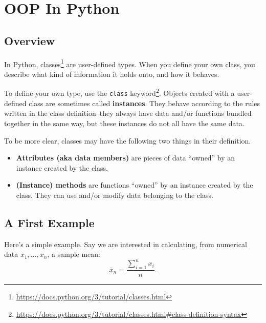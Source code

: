 \documentclass[12pt,krantz2]{krantz}
\renewcommand{\href}[2]{#2\footnote{\url{#1}}}
\begin{document}
\hypertarget{oop-in-python}{%
\section{OOP In Python}\label{oop-in-python}}

\hypertarget{overview}{%
\subsection{Overview}\label{overview}}

In Python, \href{https://docs.python.org/3/tutorial/classes.html}{classes} are user-defined types. When you define your own class, you describe what kind of information it holds onto, and how it behaves.

To define your own type, use the \href{https://docs.python.org/3/tutorial/classes.html\#class-definition-syntax}{\texttt{class} keyword}. Objects created with a user-defined class are sometimes called \textbf{instances}. They behave according to the rules written in the class definition--they always have data and/or functions bundled together in the same way, but these instances do not all have the same data.

To be more clear, classes may have the following two things in their definition.

\begin{itemize}
\item
  \textbf{Attributes (aka data members)} are pieces of data ``owned'' by an instance created by the class.
\item
  \textbf{(Instance) methods} are functions ``owned'' by an instance created by the class. They can use and/or modify data belonging to the class.
\end{itemize}

\hypertarget{a-first-example}{%
\subsection{A First Example}\label{a-first-example}}

Here's a simple example. Say we are interested in calculating, from numerical data \(x_1, \ldots, x_n\), a sample mean:
\begin{equation} 
\bar{x}_n = \frac{\sum_{i=1}^n x_i}{n}.
\end{equation}
\end{document}
